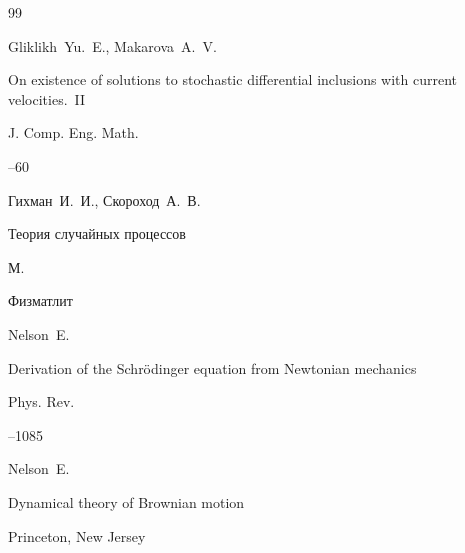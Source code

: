 \begin{thebibliography}{99}




\by Gliklikh~Yu.~E., Makarova~A.~V.

\paper On existence of solutions to stochastic differential inclusions with current velocities.~II

\jour J. Comp. Eng. Math.




--60









\by Гихман~И.~И., Скороход~А.~В. 

\book Теория случайных процессов 


\publaddr М. 

\publ Физматлит 






\by Nelson~E. 

\paper Derivation of the Schr\"{o}dinger equation from Newtonian mechanics 

\jour Phys. Rev. 




--1085





\by Nelson~E. 

\book Dynamical theory of Brownian motion 

\publaddr Princeton, New Jersey


\end{thebibliography}
